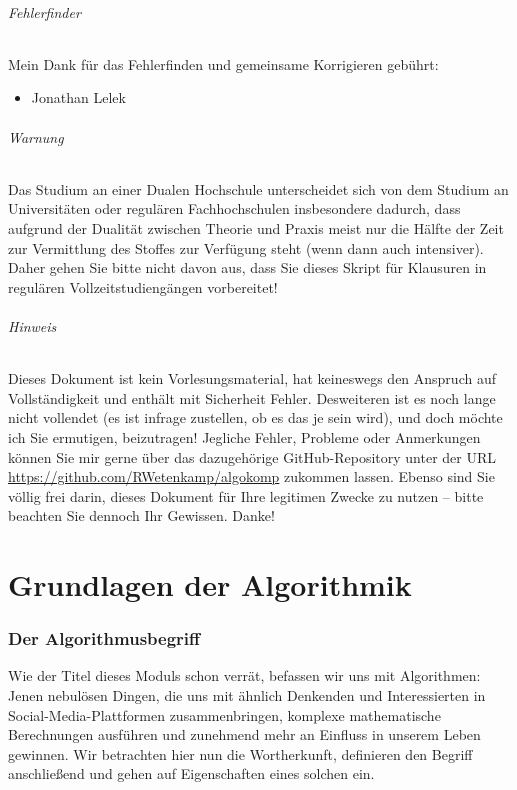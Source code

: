 \documentclass[11pt,a4paper]{scrartcl}
\begin{document}
\paragraph{Fehlerfinder} Mein Dank für das Fehlerfinden und gemeinsame Korrigieren gebührt:
\begin{itemize}
\item Jonathan Lelek
\end{itemize}
\paragraph{Warnung}
Das Studium an einer Dualen Hochschule unterscheidet sich von dem Studium an Universitäten oder regulären Fachhochschulen insbesondere dadurch, dass aufgrund der Dualität zwischen Theorie und Praxis meist nur die Hälfte der Zeit zur Vermittlung des Stoffes zur Verfügung steht (wenn dann auch intensiver). Daher gehen Sie bitte nicht davon aus, dass Sie dieses Skript für Klausuren in regulären Vollzeitstudiengängen vorbereitet!
\paragraph{Hinweis}
Dieses Dokument ist kein Vorlesungsmaterial, hat keineswegs den Anspruch auf Vollständigkeit und enthält mit Sicherheit Fehler. Desweiteren ist es noch lange nicht vollendet (es ist infrage zustellen, ob es das je sein wird), und doch möchte ich Sie ermutigen, beizutragen! Jegliche Fehler, Probleme oder Anmerkungen können Sie mir gerne über das dazugehörige GitHub-Repository unter der URL \url{https://github.com/RWetenkamp/algokomp} zukommen lassen. Ebenso sind Sie völlig frei darin, dieses Dokument für Ihre legitimen Zwecke zu nutzen -- bitte beachten Sie dennoch Ihr Gewissen. Danke!
\pagebreak
\part{Grundlagen der Algorithmik}
\section{Der Algorithmusbegriff}
Wie der Titel dieses Moduls schon verrät, befassen wir uns mit Algorithmen: Jenen nebulösen Dingen, die uns mit ähnlich Denkenden und Interessierten in Social-Media-Plattformen zusammenbringen, komplexe mathematische Berechnungen ausführen und zunehmend mehr an Einfluss in unserem Leben gewinnen. Wir betrachten hier nun die Wortherkunft, definieren den Begriff anschließend und gehen auf Eigenschaften eines solchen ein.
\end{document}
